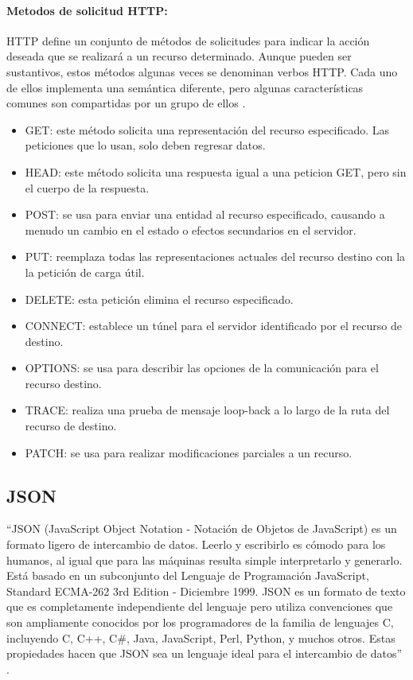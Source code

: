 \paragraph{Metodos de solicitud HTTP:}

HTTP define un conjunto de métodos de solicitudes para indicar la acción deseada que se realizará a un recurso determinado. Aunque pueden ser sustantivos, estos métodos algunas veces se denominan verbos HTTP. Cada uno de ellos implementa una semántica diferente, pero algunas características comunes son compartidas por un grupo de ellos \cite{HTTPM}.\\

\begin{itemize}
	\item GET: este método solicita una representación del recurso especificado. Las peticiones que lo usan, solo deben regresar datos.
	\item HEAD: este método solicita una respuesta igual a una peticion GET, pero sin el cuerpo de la respuesta.
	\item POST: se usa para enviar una entidad al recurso especificado, causando a menudo un cambio en el estado o efectos secundarios en el servidor.
	\item PUT: reemplaza todas las representaciones actuales del recurso destino con la la petición de carga útil.
	\item DELETE: esta petición elimina el recurso especificado.
	\item CONNECT: establece un túnel para el servidor identificado por el recurso de destino.
	\item OPTIONS: se usa para describir las opciones de la comunicación para el recurso destino.
	\item TRACE: realiza una prueba de mensaje loop-back a lo largo de la ruta del recurso de destino. 
	\item PATCH: se usa para realizar modificaciones parciales a un recurso.
\end{itemize}

\subsection{JSON}

``JSON (JavaScript Object Notation - Notación de Objetos de JavaScript) es un formato ligero de intercambio de datos. Leerlo y escribirlo es cómodo para los humanos, al igual que para las máquinas resulta simple interpretarlo y generarlo. Está basado en un subconjunto del Lenguaje de Programación JavaScript, Standard ECMA-262 3rd Edition - Diciembre 1999. JSON es un formato de texto que es completamente independiente del lenguaje pero utiliza convenciones que son ampliamente conocidos por los programadores de la familia de lenguajes C, incluyendo C, C++, C\#, Java, JavaScript, Perl, Python, y muchos otros. Estas propiedades hacen que JSON sea un lenguaje ideal para el intercambio de datos'' \cite{JSON}.\\

